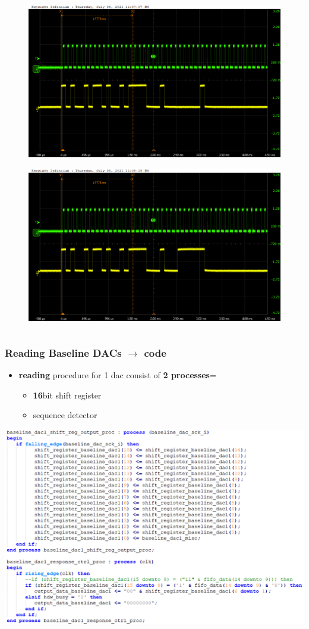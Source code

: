 \documentclass[aspectratio=169]{beamer}
\begin{document}
\begin{frame}
\begin{columns}
		\begin{center}
			\begin{figure}
				\includegraphics[width=0.55 \textwidth]{IMG/probe/09-08-2021_ch17-write01-baselinedac1.png}
				\caption{}
			\end{figure}
			\begin{figure}
				\includegraphics[width=0.55 \textwidth]{IMG/probe/09-08-2021_ch17-write63-baselinedac1.png}
				\caption{}
			\end{figure}	
		\end{center}
	\end{columns}
	\end{frame}

	\begin{frame}
	\frametitle{Reading Baseline DACs $\rightarrow$ code}
	\begin{itemize}
		\item \textbf{reading} procedure for 1 dac consist of \textbf{2 processes}=
		\begin{itemize}
			\item \textbf{16}bit shift register
			\item sequence detector 
		\end{itemize}
	\end{itemize}
		\begin{center}
			\includegraphics[width=0.6 \textwidth]{IMG/FSM_Read_States.png}
		\end{center}
	\end{frame}
\end{document}
